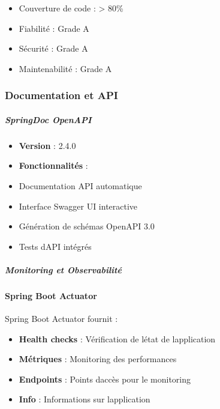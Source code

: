 \documentclass[12pt,a4paper,twoside]{report}
\begin{document}
\begin{itemize}
\item
  Couverture de code : \textgreater{} 80\%
\item
  Fiabilité : Grade A
\item
  Sécurité : Grade A
\item
  Maintenabilité : Grade A
\end{itemize}

\hypertarget{documentation-et-api}{%
\subsubsection{Documentation et API}\label{documentation-et-api}}

\hypertarget{springdoc-openapi}{%
\subparagraph{SpringDoc OpenAPI}\label{springdoc-openapi}}

\begin{itemize}
\item
  \textbf{Version} : 2.4.0
\item
  \textbf{Fonctionnalités} :
\end{itemize}

\begin{itemize}
\item
  Documentation API automatique
\item
  Interface Swagger UI interactive
\item
  Génération de schémas OpenAPI 3.0
\item
  Tests d\textquotesingle API intégrés
\end{itemize}

\hypertarget{monitoring-et-observabilituxe9}{%
\subparagraph{Monitoring et
Observabilité}\label{monitoring-et-observabilituxe9}}

\hypertarget{spring-boot-actuator}{%
\paragraph{Spring Boot Actuator}\label{spring-boot-actuator}}

Spring Boot Actuator fournit :

\begin{itemize}
\item
  \textbf{Health checks} : Vérification de l\textquotesingle état de
  l\textquotesingle application
\item
  \textbf{Métriques} : Monitoring des performances
\item
  \textbf{Endpoints} : Points d\textquotesingle accès pour le monitoring
\item
  \textbf{Info} : Informations sur l\textquotesingle application
\end{itemize}
\end{document}
